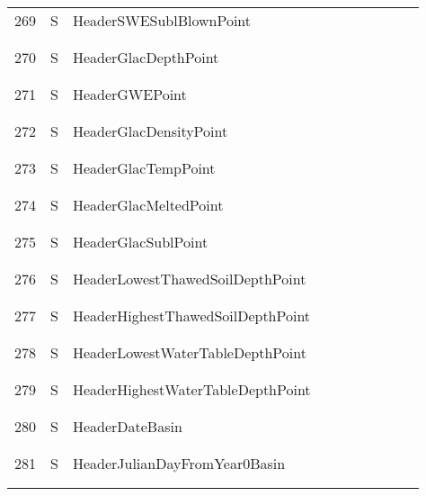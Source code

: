 \begin{longtable}{|c|c|l|c|c|c|c|p{}|c|p{}|}
269 & S & HeaderSWESublBlownPoint & & & & & & & \\
&&&&&&&&&\\\hline%
&&&&&&&&&\\
270 & S & HeaderGlacDepthPoint & & & & & & & \\
&&&&&&&&&\\\hline%
&&&&&&&&&\\
271 & S & HeaderGWEPoint & & & & & & & \\
&&&&&&&&&\\\hline%
&&&&&&&&&\\
272 & S & HeaderGlacDensityPoint & & & & & & & \\
&&&&&&&&&\\\hline%
&&&&&&&&&\\
273 & S & HeaderGlacTempPoint & & & & & & & \\
&&&&&&&&&\\\hline%
&&&&&&&&&\\
274 & S & HeaderGlacMeltedPoint & & & & & & & \\
&&&&&&&&&\\\hline%
&&&&&&&&&\\
275 & S & HeaderGlacSublPoint & & & & & & & \\
&&&&&&&&&\\\hline%
&&&&&&&&&\\
276 & S & HeaderLowestThawedSoilDepthPoint & & & & & & & \\
&&&&&&&&&\\\hline%
&&&&&&&&&\\
277 & S & HeaderHighestThawedSoilDepthPoint & & & & & & & \\
&&&&&&&&&\\\hline%
&&&&&&&&&\\
278 & S & HeaderLowestWaterTableDepthPoint & & & & & & & \\
&&&&&&&&&\\\hline%
&&&&&&&&&\\
279 & S & HeaderHighestWaterTableDepthPoint & & & & & & & \\
&&&&&&&&&\\\hline%
&&&&&&&&&\\
280 & S & HeaderDateBasin & & & & & & & \\
&&&&&&&&&\\\hline%
&&&&&&&&&\\
281 & S & HeaderJulianDayFromYear0Basin & & & & & & & \\
&&&&&&&&&\\\hline%
&&&&&&&&&\\

\end{longtable}
